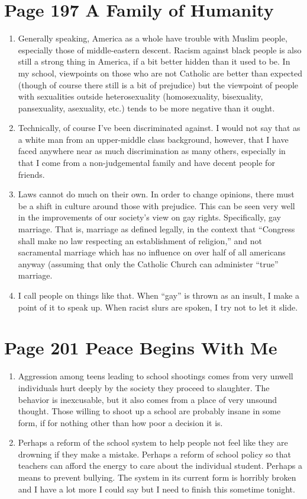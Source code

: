 \documentclass[11pt]{article}
\begin{document}
\section{Page 197 A Family of Humanity}
\begin{enumerate}
	\item Generally speaking, America as a whole have trouble with Muslim people,
		especially those of middle-eastern descent.  Racism against black people is
		also still a strong thing in America, if a bit better hidden than it used
		to be.  In my school, viewpoints on those who are not Catholic are better
		than expected (though of course there still is a bit of prejudice) but the
		viewpoint of people with sexualities outside heterosexuality (homosexuality,
		bisexuality, pansexuality, asexuality, etc.) tends to be more negative than
		it ought.
	\item Technically, of course I've been discriminated against.  I would not say
		that as a white man from an upper-middle class background, however, that I
		have faced anywhere near as much discrimination as many others, especially 
		in that I come from a non-judgemental family and have decent people for 
		friends.
	\item Laws cannot do much on their own.  In order to change opinions, there
		must be a shift in culture around those with prejudice.  This can be seen
		very well in the improvements of our society's view on gay rights.
		Specifically, gay marriage.  That is, marriage as defined legally, in the 
		context that ``Congress shall make no law respecting an establishment of 
		religion,'' and not sacramental marriage which has no influence on over
		half of all americans anyway (assuming that only the Catholic Church can 
		administer ``true'' marriage.
	\item I call people on things like that.  When ``gay'' is thrown as an insult,
		I make a point of it to speak up.  When racist slurs are spoken, I try not
		to let it slide.
\end{enumerate}

\section{Page 201 Peace Begins With Me}
\begin{enumerate}
	\item Aggression among teens leading to school shootings comes from very 
		unwell individuals hurt deeply by the society they proceed to slaughter.
		The behavior is inexcusable, but it also comes from a place of very unsound
		thought.  Those willing to shoot up a school are probably insane in some
		form, if for nothing other than how poor a decision it is.
	\item Perhaps a reform of the school system to help people not feel like they
		are drowning if they make a mistake.  Perhaps a reform of school policy so
		that teachers can afford the energy to care about the individual student.  
		Perhaps a means to prevent bullying.  The system in its current form is 
		horribly broken and I have a lot more I could say but I need to finish this
		sometime tonight.
\end{enumerate}
\end{document}
